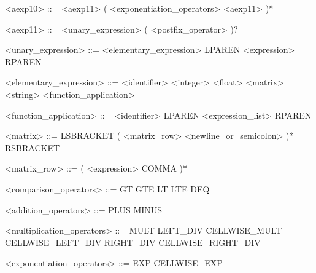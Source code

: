 \documentclass{article}
\begin{document}
\begin{grammar}
	<aexp10> ::= <aexp11> ( <exponentiation_operators> <aexp11> )*
	
	<aexp11> ::= <unary_expression> ( <postfix_operator> )?
	
	<unary_expression> ::= <elementary_expression> \alt LPAREN <expression> RPAREN
	
	<elementary_expression> ::= <identifier> \alt <integer> \alt <float> \alt <matrix> \alt <string> \alt <function_application>
	
	<function_application> ::= <identifier> LPAREN <expression_list> RPAREN
	
	<matrix> ::= LSBRACKET ( <matrix_row> <newline_or_semicolon> )* RSBRACKET
	
	<matrix_row> ::= ( <expression> COMMA )*
	
	<comparison_operators> ::= GT \alt GTE \alt LT \alt LTE \alt DEQ
	
	<addition_operators> ::= PLUS \alt MINUS
	
	<multiplication_operators> ::= MULT \alt LEFT_DIV \alt CELLWISE_MULT \alt CELLWISE_LEFT_DIV \alt RIGHT_DIV \alt CELLWISE_RIGHT_DIV
	
	<exponentiation_operators> ::= EXP \alt CELLWISE_EXP
\end{grammar}
\end{document}
